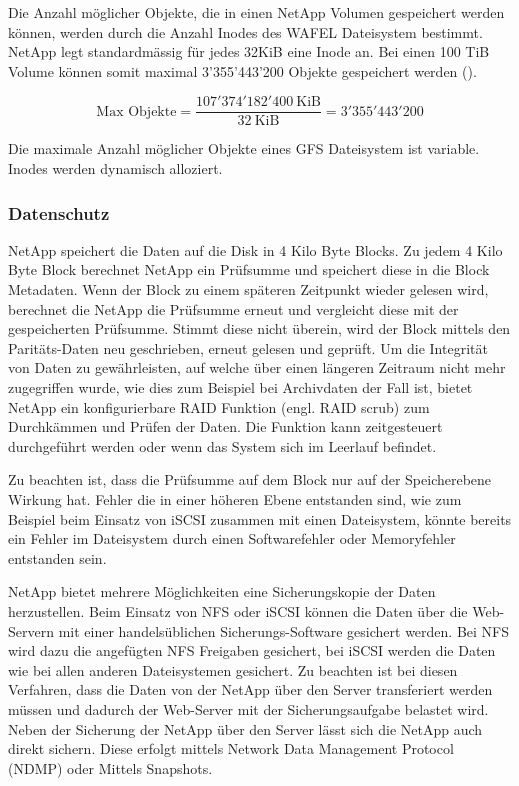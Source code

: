 Die Anzahl möglicher Objekte, die in einen NetApp Volumen gespeichert werden können, werden durch die Anzahl Inodes des WAFEL Dateisystem bestimmt. NetApp legt standardmässig für jedes 32KiB eine Inode an. Bei einen 100 TiB Volume können somit maximal 3'355'443'200 Objekte gespeichert werden ().

\begin{equation}
\mbox{Max Objekte} = \frac{107'374'182'400 \mathrm{\ KiB}}{32 \mathrm{\ KiB}}= 3'355'443'200 
\label{eqn:MaxObjekteNetApp}
\end{equation}

Die maximale Anzahl möglicher Objekte eines GFS Dateisystem ist variable. Inodes werden dynamisch alloziert.

\subsubsection*{Datenschutz}
NetApp speichert die Daten auf die Disk in 4 Kilo Byte Blocks. Zu jedem 4 Kilo Byte Block berechnet NetApp ein Prüfsumme und speichert diese in die Block Metadaten. Wenn der Block zu einem späteren Zeitpunkt wieder gelesen wird, berechnet die NetApp die Prüfsumme erneut und vergleicht diese mit der gespeicherten Prüfsumme. Stimmt diese nicht überein, wird der Block mittels den Paritäts-Daten neu geschrieben, erneut gelesen und geprüft. Um die Integrität von Daten zu gewährleisten, auf welche über einen längeren Zeitraum nicht mehr zugegriffen wurde, wie dies zum Beispiel bei Archivdaten der Fall ist, bietet NetApp ein konfigurierbare RAID Funktion (engl. RAID scrub) zum Durchkämmen und Prüfen der Daten. Die Funktion kann zeitgesteuert durchgeführt werden oder wenn das System sich im Leerlauf befindet. \cite{Sundaram2006}

Zu beachten ist, dass die Prüfsumme auf dem Block nur auf der Speicherebene Wirkung hat. Fehler die in einer höheren Ebene entstanden sind, wie zum Beispiel beim Einsatz von iSCSI zusammen mit einen Dateisystem, könnte bereits ein Fehler im Dateisystem durch einen Softwarefehler oder Memoryfehler entstanden sein. 

NetApp bietet mehrere Möglichkeiten eine Sicherungskopie der Daten herzustellen. Beim Einsatz von NFS oder iSCSI können die Daten über die Web-Servern mit einer handelsüblichen Sicherungs-Software gesichert werden. Bei NFS wird dazu die angefügten NFS Freigaben gesichert, bei iSCSI werden die Daten wie bei allen anderen Dateisystemen gesichert. Zu beachten ist bei diesen Verfahren, dass die Daten von der NetApp über den Server transferiert werden müssen und dadurch der Web-Server mit der Sicherungsaufgabe belastet wird. Neben der Sicherung der NetApp über den Server lässt sich die NetApp auch direkt sichern. Diese erfolgt mittels Network Data Management Protocol (NDMP) oder Mittels Snapshots. 

